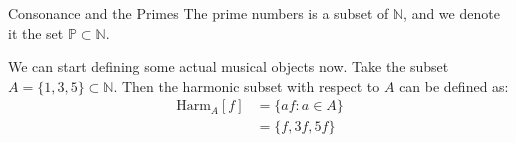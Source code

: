 \documentclass[usenames,dvipsnames]{beamer}
\newcommand{\N}{\mathbb{N}}
\begin{document}
\begin{frame}{Consonance and the Primes}
The prime numbers is a subset of $\mathbb{N}$, and we denote it the set $\mathbb{P} \subset \mathbb{N}$.

We can start defining some actual musical objects now. Take the subset $A  = \{1,3,5\} \subset \N$. Then the harmonic subset with respect to $A$ can be defined as: 
\begin{align*}
\text{Harm}_A [f] &= \{af : a \in A\} \\
&=\{f,3f,5f\}
\end{align*}

\end{frame}
  
\end{document}
